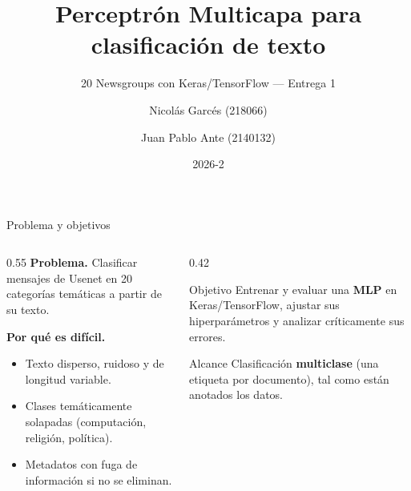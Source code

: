 \documentclass[10pt,aspectratio=169]{beamer}
\title[MLP para clasificación de texto]{Perceptrón Multicapa para clasificación de texto}
\subtitle{20 Newsgroups con Keras/TensorFlow --- Entrega 1}
\author[Redes Neuronales]{Nicolás Garcés (218066) \and Juan Pablo Ante (2140132)}
\institute[Univalle]{Escuela de Ingeniería de Sistemas y Computación\\Universidad del Valle}
\date{2026-2}
\begin{document}
\begin{frame}
  \titlepage
\end{frame}

\begin{frame}{Problema y objetivos}
  \begin{columns}[T]
    \begin{column}{0.55\textwidth}
      \textbf{Problema.} Clasificar mensajes de Usenet en 20 categorías
      temáticas a partir de su texto.
      \vspace{0.3cm}

      \textbf{Por qué es difícil.}
      \begin{itemize}
        \item Texto disperso, ruidoso y de longitud variable.
        \item Clases temáticamente solapadas (computación, religión, política).
        \item Metadatos con fuga de información si no se eliminan.
      \end{itemize}
    \end{column}
    \begin{column}{0.42\textwidth}
      \begin{block}{Objetivo}
        Entrenar y evaluar una \textbf{MLP} en Keras/TensorFlow, ajustar sus
        hiperparámetros y analizar críticamente sus errores.
      \end{block}
      \begin{alertblock}{Alcance}
        Clasificación \textbf{multiclase} (una etiqueta por documento), tal
        como están anotados los datos.
      \end{alertblock}
    \end{column}
  \end{columns}
\end{frame}
\end{document}
